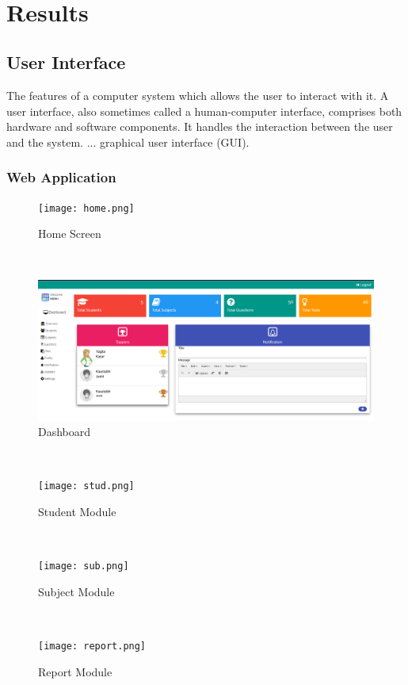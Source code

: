 \documentclass[oneside,a4paper,12pt]{report}
\begin{document}
\\    
   
\chapter{Results}
\newpage
\section{User Interface}
\hspace*{0.3in} The features of a computer system which allows the user to interact with it. A user interface, also sometimes called a human-computer interface, comprises both hardware and software components. It handles the interaction between the user and the system. ... graphical user interface (GUI).\\
\subsection{Web Application}
\begin{figure}[!h]
\centering
\texttt{[image: home.png]}
\caption{Home Screen}
\end{figure}
\\
\begin{figure}[!h]
\centering
\includegraphics[height=6.0 cm,width=10.0 cm]{dash.png}
\caption{Dashboard}
\end{figure}
\\

\begin{figure}[!h]
\centering
\texttt{[image: stud.png]}
\caption{Student Module}
\end{figure}
\\
\newpage
\begin{figure}[!h]
\centering
\texttt{[image: sub.png]}
\caption{Subject Module}
\end{figure}
\\
\begin{figure}[!h]
\centering
\texttt{[image: report.png]}
\caption{Report Module}
\end{figure}
\\
\end{document}
